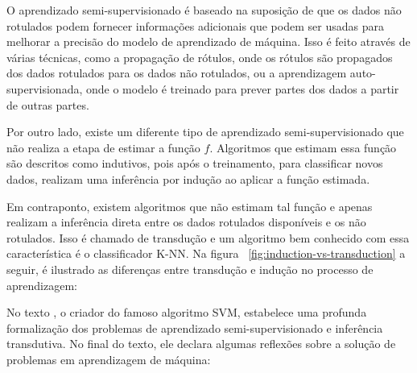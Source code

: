 O aprendizado semi-supervisionado é baseado na suposição de que os
dados não rotulados podem fornecer informações adicionais que podem
ser usadas para melhorar a precisão do modelo de aprendizado de
máquina. Isso é feito através de várias técnicas, como a propagação de
rótulos, onde os rótulos são propagados dos dados rotulados para os
dados não rotulados, ou a aprendizagem auto-supervisionada, onde o
modelo é treinado para prever partes dos dados a partir de outras
partes.

Por outro lado, existe um diferente tipo de aprendizado
semi-supervisionado que não realiza a etapa de estimar a função $ f
$. Algoritmos que estimam essa função são descritos como indutivos,
pois após o treinamento, para classificar novos dados, realizam uma
inferência por indução ao aplicar a função estimada.

Em contraponto, existem algoritmos que não estimam tal função e apenas
realizam a inferência direta entre os dados rotulados disponíveis e os
não rotulados. Isso é chamado de transdução e um algoritmo bem
conhecido com essa característica é o classificador K-NN. Na figura ~\ref{fig:induction-vs-transduction} a
seguir, é ilustrado as diferenças entre transdução e indução no
processo de aprendizagem:


\begin{figure}[h!]
        \captionsetup{width=12cm}
		\centering
\end{figure}


No texto \cite{vapnik2006semi}, o criador do famoso algoritmo SVM,
estabelece uma profunda formalização dos problemas de aprendizado
semi-supervisionado e inferência transdutiva. No final do texto, ele declara
algumas reflexões sobre a solução de problemas em aprendizagem de máquina:


